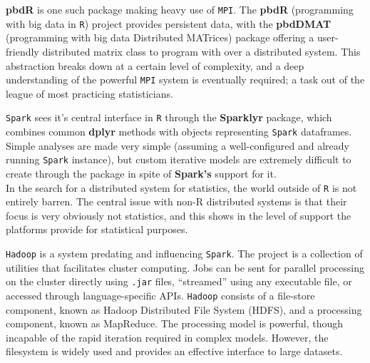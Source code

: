\textbf{pbdR} is one such package making heavy use of \texttt{MPI}\cite{pbdR2012}.
The \textbf{pbdR} (programming with big data in \texttt{R}) project provides persistent data, with the \textbf{pbdDMAT} (programming with big data Distributed MATrices) package offering a user-friendly distributed matrix class to program with over a distributed system\cite{pbdDMATpackage}.
This abstraction breaks down at a certain level of complexity, and a deep understanding of the powerful \texttt{MPI} system is eventually required; a task out of the league of most practicing statisticians.

\texttt{Spark} sees it's central interface in \texttt{R} through the \textbf{Sparklyr} package, which combines common \textbf{dplyr} methods with objects representing \texttt{Spark} dataframes\cite{luraschi20}.
Simple analyses are made very simple (assuming a well-configured and already running \texttt{Spark} instance), but custom iterative models are extremely difficult to create through the package in spite of \textbf{Spark's} support for it.\\

In the search for a distributed system for statistics, the world outside of \texttt{R} is not entirely barren.
The central issue with non-R distributed systems is that their focus is very obviously not statistics, and this shows in the level of support the platforms provide for statistical purposes.

\texttt{Hadoop} is a system predating and influencing \texttt{Spark}\cite{shvachko2010hadoop}.
The project is a collection of utilities that facilitates cluster computing.
Jobs can be sent for parallel processing on the cluster directly using \texttt{.jar} files, ``streamed'' using any executable file, or accessed through language-specific APIs.
\texttt{Hadoop} consists of a file-store component, known as Hadoop Distributed File System (HDFS), and a processing component, known as MapReduce.
The processing model is powerful, though incapable of the rapid iteration required in complex models\cite{zaharia2010spark}.
However, the filesystem is widely used and provides an effective interface to large datasets.


